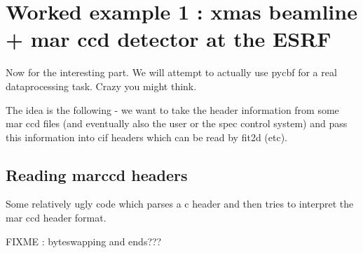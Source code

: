 \documentclass[10pt,a4paper,twoside,notitlepage]{article}
\begin{document}
\begin{flushleft}
\begin{minipage}{\linewidth}
\begin{list}{}{\setlength{\itemsep}{-\parsep}\setlength{\itemindent}{-\leftmargin}}
\item{}
\end{list}
\end{minipage}\vspace{4ex}
\end{flushleft}
\section{Worked example 1 : xmas beamline + mar ccd detector at the ESRF}

Now for the interesting part. We will attempt to actually use pycbf for a real
dataprocessing task. Crazy you might think.

The idea is the following - we want to take the header information from some 
mar ccd files (and eventually also the user or the spec control system) and
pass this information into cif headers which can be read by fit2d (etc).

\subsection{Reading marccd headers}

Some relatively ugly code which parses a c header and then tries to interpret
the mar ccd header format. 

FIXME : byteswapping and ends???
\end{document}
